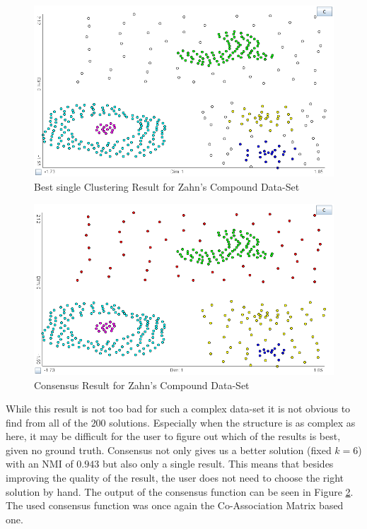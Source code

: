 \documentclass[
	a4paper,
	english,
	twoside,
	openright,               
	11pt                            
	]{report}
\begin{document}
\begin{figure}[h]
	\centering
	\includegraphics[scale=.5]{zahn_best}
	\caption{Best single Clustering Result for Zahn's Compound Data-Set}
	\label{fig:zahn_best}
\end{figure}
\begin{figure}[h]
	\centering
	\includegraphics[scale=.5]{zahn_consensus}
	\caption{Consensus Result for Zahn's Compound Data-Set}
	\label{fig:zahn_consensus}
\end{figure}

While this result is not too bad for such a complex data-set it is not obvious to find from all of the $200$ solutions. Especially when the structure is as complex as here, it may be difficult for the user to figure out which of the results is best, given no ground truth. Consensus not only gives us a better solution (fixed $k=6$) with an NMI of $0.943$ but also only a single result. This means that besides improving the quality of the result, the user does not need to choose the right solution by hand. The output of the consensus function can be seen in Figure \ref{fig:zahn_consensus}. The used consensus function was once again the Co-Association Matrix based one.
\end{document}
